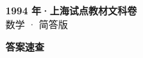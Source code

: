 \documentclass[zihao=-4, a4paper]{ctexart}
\begin{document}
\begin{center}
  {\Large\bfseries 1994 年·上海试点教材文科卷}\\[4pt]
  {\large 数学 · 简答版}
\end{center}
\medskip
{}

\clearpage
{}
\begin{center}{\Large\bfseries 答案速查}\end{center}
\medskip

\end{document}
